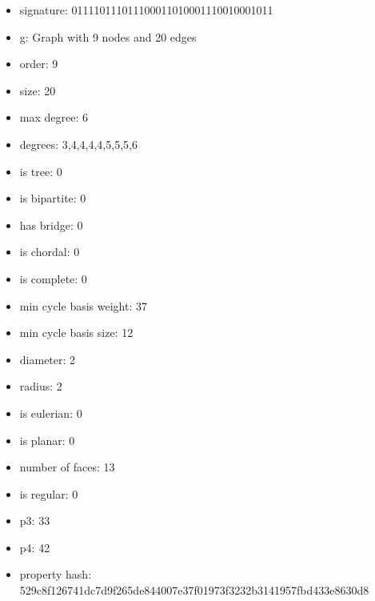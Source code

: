\newpage
\begin{figure}
\end{figure}
\begin{itemize}
\item signature: 011110111011100011010001110010001011
\item g: Graph with 9 nodes and 20 edges
\item order: 9
\item size: 20
\item max degree: 6
\item degrees: 3,4,4,4,4,5,5,5,6
\item is tree: 0
\item is bipartite: 0
\item has bridge: 0
\item is chordal: 0
\item is complete: 0
\item min cycle basis weight: 37
\item min cycle basis size: 12
\item diameter: 2
\item radius: 2
\item is eulerian: 0
\item is planar: 0
\item number of faces: 13
\item is regular: 0
\item p3: 33
\item p4: 42
\item property hash: 529c8f126741dc7d9f265de844007e37f01973f3232b3141957fbd433e8630d8
\end{itemize}
